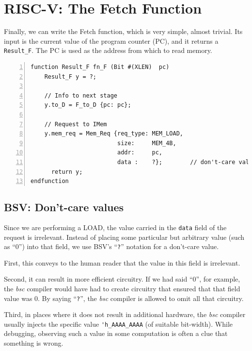 
\section{RISC-V: The Fetch Function}

\label{Sec_Fetch_function}

Finally, we can write the Fetch function, which is very simple, almost
trivial.  Its input is the current value of the program counter (PC),
and it returns a \verb|Result_F|.  The PC is used as the address from
which to read memory.

\begin{Verbatim}[frame=single, numbers=left]
function Result_F fn_F (Bit #(XLEN)  pc)
    Result_F y = ?;

    // Info to next stage
    y.to_D = F_to_D {pc: pc};

    // Request to IMem
    y.mem_req = Mem_Req {req_type: MEM_LOAD,
                         size:     MEM_4B,
                         addr:     pc,
                         data :    ?};        // don't-care value
      return y;
endfunction
\end{Verbatim}


\subsection{BSV: Don't-care values} 


Since we are performing a LOAD, the value carried in the \verb|data|
field of the request is irrelevant.  Instead of placing some
particular but arbitrary value (such as ``0'') into that field, we use
BSV's ``\verb|?|'' notation for a don't-care value.

First, this conveys to the human reader that the value in this field
is irrelevant.

Second, it can result in more efficient circuitry.  If we had said
``0'', for example, the \emph{bsc} compiler would have had to create
circuitry that ensured that that field value was 0. By saying
``\verb|?|'', the \emph{bsc} compiler is allowed to omit all that
circuitry.

Third, in places where it does not result in additional hardware, the
\emph{bsc} compiler usually injects the specific value
\verb|'h_AAAA_AAAA| (of suitable bit-width).  While debugging,
observing such a value in some computation is often a clue that
something is wrong.


